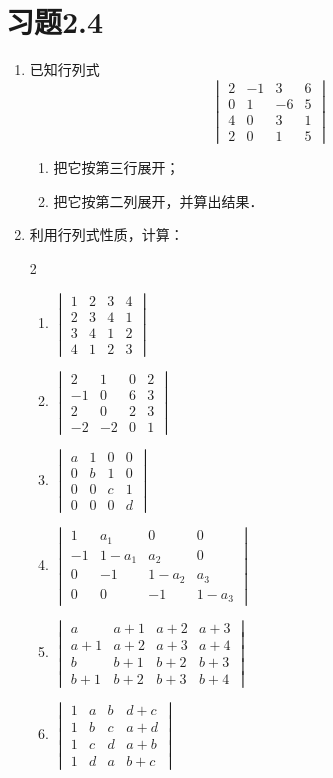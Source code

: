 \section*{习题2.4}
\begin{enumerate}
    \item 已知行列式
\[\begin{vmatrix}
    2 &-1&3&6\\
    0&1&-6&5\\
    4&0&3&1\\
    2&0&1&5
\end{vmatrix}\]
    \begin{enumerate}
        \item 把它按第三行展开；
        \item 把它按第二列展开，并算出结果．
    \end{enumerate}
\item 利用行列式性质，计算：
\begin{multicols}{2}
\begin{enumerate}
    \item $\begin{vmatrix}
   1&2&3&4\\2&3&4&1\\3&4&1&2\\4&1&2&3     
    \end{vmatrix}$
    \item $\begin{vmatrix}
        2&1&0&2\\-1&0&6&3\\2&0&2&3\\-2&-2&0&1
    \end{vmatrix}$
    \item $\begin{vmatrix}
        a&1&0&0\\0&b&1&0\\0&0&c&1\\0&0&0&d
    \end{vmatrix}$
    \item $\begin{vmatrix}
        1&a_1&0&0\\-1&1-a_1&a_2&0\\
        0&-1&1-a_2&a_3\\0&0&-1&1-a_3
    \end{vmatrix}$
    \item $\begin{vmatrix}
        a&a+1&a+2&a+3\\
        a+1&a+2&a+3&a+4\\
        b&b+1&b+2&b+3\\
        b+1&b+2&b+3&b+4
    \end{vmatrix}$
    \item $\begin{vmatrix}
        1&a&b&d+c\\1&b&c&a+d\\1&c&d&a+b\\1&d&a&b+c
    \end{vmatrix}$
\end{enumerate}
\end{multicols}


\end{enumerate}
